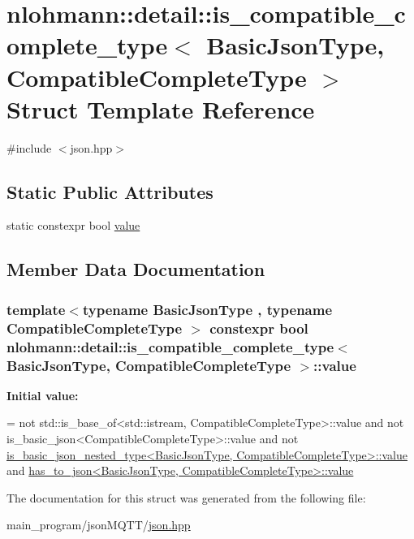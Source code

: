 \hypertarget{structnlohmann_1_1detail_1_1is__compatible__complete__type}{}\section{nlohmann\+:\+:detail\+:\+:is\+\_\+compatible\+\_\+complete\+\_\+type$<$ Basic\+Json\+Type, Compatible\+Complete\+Type $>$ Struct Template Reference}
\label{structnlohmann_1_1detail_1_1is__compatible__complete__type}


{\ttfamily \#include $<$json.\+hpp$>$}

\subsection*{Static Public Attributes}
\begin{DoxyCompactItemize}
\item 
static constexpr bool \hyperlink{structnlohmann_1_1detail_1_1is__compatible__complete__type_a34bed4700a302b79feb045b6bdbda9aa}{value}
\end{DoxyCompactItemize}


\subsection{Member Data Documentation}
\subsubsection[{\texorpdfstring{value}{value}}]{\setlength{\rightskip}{0pt plus 5cm}template$<$typename Basic\+Json\+Type , typename Compatible\+Complete\+Type $>$ constexpr bool {\bf nlohmann\+::detail\+::is\+\_\+compatible\+\_\+complete\+\_\+type}$<$ Basic\+Json\+Type, Compatible\+Complete\+Type $>$\+::value\hspace{0.3cm}{\ttfamily [static]}}\hypertarget{structnlohmann_1_1detail_1_1is__compatible__complete__type_a34bed4700a302b79feb045b6bdbda9aa}{}\label{structnlohmann_1_1detail_1_1is__compatible__complete__type_a34bed4700a302b79feb045b6bdbda9aa}
{\bfseries Initial value\+:}
\begin{DoxyCode}
=
        not std::is\_base\_of<std::istream, CompatibleCompleteType>::value and
        not is\_basic\_json<CompatibleCompleteType>::value and
        not 
      \hyperlink{structnlohmann_1_1detail_1_1is__basic__json__nested__type_aee5fee744e5298a78d557f2ee5f090db}{is\_basic\_json\_nested\_type<BasicJsonType, CompatibleCompleteType>::value}
       and
        \hyperlink{structnlohmann_1_1detail_1_1has__to__json_a18e260c3c6f10328637c4427d3cb3a31}{has\_to\_json<BasicJsonType, CompatibleCompleteType>::value}
\end{DoxyCode}


The documentation for this struct was generated from the following file\+:\begin{DoxyCompactItemize}
\item 
main\+\_\+program/json\+M\+Q\+T\+T/\hyperlink{json_8hpp}{json.\+hpp}\end{DoxyCompactItemize}

